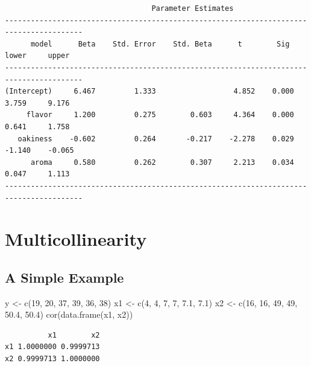 \documentclass[
  letterpaper,
  DIV=11,
  numbers=noendperiod]{scrreprt}
\newenvironment{Shaded}{\begin{snugshade}}{\end{snugshade}}
\newcommand{\DecValTok}[1]{\textcolor[rgb]{0.68,0.00,0.00}{#1}}
\newcommand{\FloatTok}[1]{\textcolor[rgb]{0.68,0.00,0.00}{#1}}
\newcommand{\FunctionTok}[1]{\textcolor[rgb]{0.28,0.35,0.67}{#1}}
\newcommand{\NormalTok}[1]{\textcolor[rgb]{0.00,0.23,0.31}{#1}}
\newcommand{\OtherTok}[1]{\textcolor[rgb]{0.00,0.23,0.31}{#1}}
\begin{document}
\begin{verbatim}
                                  Parameter Estimates                                    
----------------------------------------------------------------------------------------
      model      Beta    Std. Error    Std. Beta      t        Sig      lower     upper 
----------------------------------------------------------------------------------------
(Intercept)     6.467         1.333                  4.852    0.000     3.759     9.176 
     flavor     1.200         0.275        0.603     4.364    0.000     0.641     1.758 
   oakiness    -0.602         0.264       -0.217    -2.278    0.029    -1.140    -0.065 
      aroma     0.580         0.262        0.307     2.213    0.034     0.047     1.113 
----------------------------------------------------------------------------------------
\end{verbatim}

\section{Multicollinearity}\label{multicollinearity}

\subsection{A Simple Example}\label{a-simple-example}

\begin{Shaded}
\begin{Highlighting}[]
\NormalTok{y }\OtherTok{\textless{}{-}} \FunctionTok{c}\NormalTok{(}\DecValTok{19}\NormalTok{, }\DecValTok{20}\NormalTok{, }\DecValTok{37}\NormalTok{, }\DecValTok{39}\NormalTok{, }\DecValTok{36}\NormalTok{, }\DecValTok{38}\NormalTok{)}
\NormalTok{x1 }\OtherTok{\textless{}{-}} \FunctionTok{c}\NormalTok{(}\DecValTok{4}\NormalTok{, }\DecValTok{4}\NormalTok{, }\DecValTok{7}\NormalTok{, }\DecValTok{7}\NormalTok{, }\FloatTok{7.1}\NormalTok{, }\FloatTok{7.1}\NormalTok{)}
\NormalTok{x2 }\OtherTok{\textless{}{-}} \FunctionTok{c}\NormalTok{(}\DecValTok{16}\NormalTok{, }\DecValTok{16}\NormalTok{, }\DecValTok{49}\NormalTok{, }\DecValTok{49}\NormalTok{, }\FloatTok{50.4}\NormalTok{, }\FloatTok{50.4}\NormalTok{)}
\FunctionTok{cor}\NormalTok{(}\FunctionTok{data.frame}\NormalTok{(x1, x2))}
\end{Highlighting}
\end{Shaded}

\begin{verbatim}
          x1        x2
x1 1.0000000 0.9999713
x2 0.9999713 1.0000000
\end{verbatim}
\end{document}
